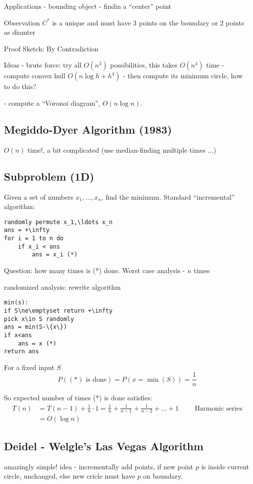 \documentclass[english,12pt]{article}
\theoremstyle{plain}
\theoremstyle{definition}
\theoremstyle{definition} %
\begin{document}
Applications - bounding object
- findin a ``center'' point

Observation $C^\ast$ is a unique and must have 3 points on the boundary or 2 points as diamter

Proof Sketch: By Contradiction

Ideas - brute force: try all $O(n^3)$ possibilities, this takes $O(n^4)$ time
- compute convex hull $O(n\log h + h^4)$
- then compute its minimum circle, how to do this?

- compute a ``Voronoi diagram'', $O(n\log n)$.

\subsection{Megiddo-Dyer Algorithm (1983)}
$O(n)$ time!, a bit complicated (use median-finding multiple times ...)


\subsection{Subproblem (1D)}
Given a set of numbers $x_1,\ldots , x_n$, find the minimum.  Standard ``incremental'' algorithm:
\begin{verbatim}
randomly permute x_1,\ldots x_n
ans = +\infty 
for i = 1 to n do
    if x_i < ans
        ans = x_i (*)
\end{verbatim}

Question: how many times is (*) done.
Worst case analysis - $n$ times

randomized analysis: rewrite algorithm
\begin{verbatim}
min(s):
if S\ne\emptyset return +\infty 
pick x\in S randomly
ans = min(S-\{x\})
if x<ans
    ans = x (*)
return ans
\end{verbatim}

For a fixed input $S$
\[P((*) \text{ is done})=P(x=\min(S))=\frac{1}{n}\]

So expected number of times (*) is done satisfies:
\begin{align*}
T(n) &= T(n-1)+\frac{1}{n}\cdot 1
=\frac{1}{n}+\frac{1}{n-1}+\frac{1}{n-2}+\ldots+ 1\qquad\text{ Harmonic series}\\
&=O(\log n)
\end{align*}

\subsection{Deidel - Welgle's Las Vegas Algorithm}
amazingly simple!
idea - incrementally add points, if new point $p$ is inside current circle, unchanged, else new cricle must have $p$ on boundary.
\end{document}

